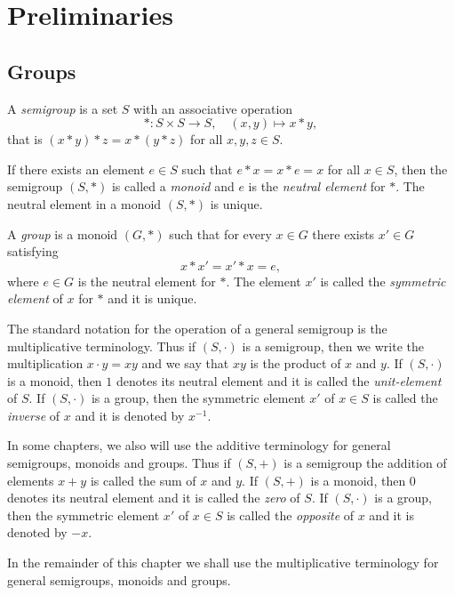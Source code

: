 \chapter{Preliminaries}
\label{preliminaries}


\section{Groups}

A {\em semigroup} is a set $S$ with an associative operation
\[ 
*\colon S\times S \longrightarrow S, 
\quad
(x,y)\mapsto x*y,
\]
that is $(x*y)*z=x*(y*z)$ for all $x,y,z\in S$.

If there exists an element $e\in S$ such that $e*x=x*e=x$ for all $x\in S$, then 
the semigroup $(S,*)$ is called a  {\em monoid} and $e$ is the {\em neutral element} for $*$. 
The neutral element in a monoid $(S,*)$ is unique.

A {\em group} is a monoid $(G,*)$ such that for every $x\in G$ there exists $x'\in G$ satisfying
\[ 
x*x'=x'*x=e,
\]
where $e\in G$ is the neutral element for $*$. The element $x'$ is called 
the {\em symmetric element} of $x$ for $*$ and it is unique.

The standard notation for the operation of a general semigroup is the multiplicative terminology. 
Thus if $(S,\cdot)$ is a semigroup, then we write the multiplication  $x\cdot y=xy$  
and we say that $xy$ is the product of $x$ and $y$. If $(S,\cdot)$  is a monoid, 
then $1$ denotes its neutral element and it is called the {\em unit-element} of $S$. 
If $(S,\cdot)$ is a group, then the symmetric element $x'$ of $x\in S$ is called the {\em inverse} 
of $x$ and it is denoted by $x^{-1}$.

In some chapters, we also will use the additive terminology for general semigroups, monoids and groups. 
Thus if $(S,+)$ is a semigroup the addition of elements $x+y$ is called the sum of $x$ and $y$. If $(S,+)$ 
is a monoid, then $0$ denotes its neutral element and it is called the {\em zero} of $S$. 
If $(S,\cdot)$ is a group, then the symmetric element $x'$ of $x\in S$ is called the {\em opposite} of $x$ and it is denoted by $-x$.

In the remainder of this chapter we shall use the multiplicative terminology for general semigroups, monoids and groups.

